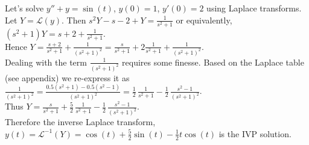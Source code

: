 \documentclass{ximera}
\begin{document}
 Let's solve $y''+y=\sin{(t)}$, $y(0)=1$, $y'(0)=2$ using Laplace transforms.  \\

 Let $Y=\mathcal{L}(y)$.  Then  $s^2Y-s-2+Y=\frac{1}{s^2+1}$  or equivalently, \\$\displaystyle (s^2+1)Y=s+2+\frac{1}{s^2+1}$.\\


 Hence $\displaystyle Y=\frac{s+2}{s^2+1}+\frac{1}{(s^2+1)^2}=\frac{s}{s^2+1}+2\frac{1}{s^2+1}+\frac{1}{(s^2+1)^2}$.\\

 Dealing with the term $\frac{1}{(s^2+1)^2}$ requires some finesse.  Based on the Laplace table (see appendix) we re-express it as \\

 $\displaystyle \frac{1}{(s^2+1)^2}=\frac{0.5(s^2+1)-0.5(s^2-1)}{(s^2+1)^2}=\frac{1}{2}\,\frac{1}{s^2+1}-\frac{1}{2}\,\frac{s^2-1}{(s^2+1)^2}$.\\


 Thus $\displaystyle Y=\frac{s}{s^2+1}+\frac{5}{2}\,\frac{1}{s^2+1}-\frac{1}{2}\,\frac{s^2-1}{(s^2+1)^2}$.\\


 Therefore the inverse Laplace transform, \\$y(t)=\mathcal{L}^{-1}(Y)=\cos{(t)}+\frac{5}{2}\sin{(t)}-\frac{1}{2}t\cos{(t)}$ is the IVP solution. 
\end{document}
